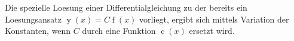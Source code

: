 Die spezielle Loesung einer Differentialgleichung zu der bereits ein Loesungsansatz $\operatorname{y}(x) = C \operatorname{f}(x)$ vorliegt, ergibt sich mittels Variation der Konstanten, wenn $C$ durch eine Funktion $\operatorname{c}(x)$ ersetzt wird.
